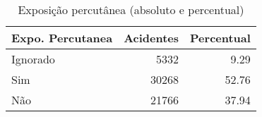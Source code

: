 \begin{table}
\caption{Exposição percutânea (absoluto e percentual)}
\begin{tabular}{lrr}
\toprule
Expo. Percutanea & Acidentes & Percentual \\
\midrule
Ignorado & 5332 & 9.29 \\
Sim & 30268 & 52.76 \\
Não & 21766 & 37.94 \\
\bottomrule
\end{tabular}
\end{table}
